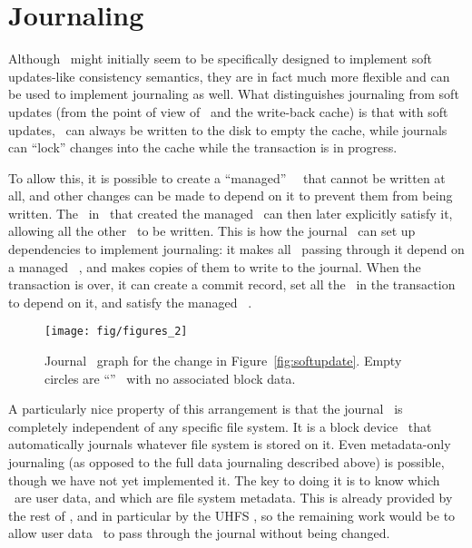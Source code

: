 \section{Journaling}
\label{sec:journal}

Although \chdescs\ might initially seem to be specifically designed to
implement soft updates-like consistency semantics, they are in fact much more
flexible and can be used to implement journaling as well. What distinguishes
journaling from soft updates (from the point of view of \chdescs\ and
the write-back cache) is that with soft updates, \chdescs\ can always
be written to the disk to empty the cache, while journals can ``lock'' changes
into the cache while the transaction is in progress.

To allow this, it is possible to create a ``managed'' \noop\ \chdesc\ that
cannot be written at all, and other changes can be made to depend on it to
prevent them from being written. The \module\ in \Kudos\ that created the
managed \chdesc\ can then later explicitly satisfy it, allowing all the other
\chdescs\ to be written. This is how the journal \module\ can set up
dependencies to implement journaling: it makes all \chdescs\ passing through it
depend on a managed \noop\ \chdesc, and makes copies of them to write to the
journal. When the transaction is over, it can create a commit record, set all
the \chdescs\ in the transaction to depend on it, and satisfy the managed \noop\
\chdesc.

\begin{figure}
  \centering
  \texttt{[image: fig/figures\_2]}
  \caption{\label{fig:journal} Journal \chdesc\ graph for the
    change in Figure~\ref{fig:softupdate}. Empty circles are
    ``\noop'' \chdescs\ with no associated block data.}
\end{figure}

A particularly nice property of this arrangement is that the journal \module\
is completely independent of any specific file system. It is a block device
\module\ that automatically journals whatever file system is stored on it. Even
metadata-only journaling (as opposed to the full data journaling described
above) is possible, though we have not yet implemented it. The key to doing it
is to know which \chdescs\ are user data, and which are file system metadata.
This is already provided by the rest of \Kudos, and in particular by the UHFS
\module, so the remaining work would be to allow user data \chdescs\ to pass
through the journal without being changed.
